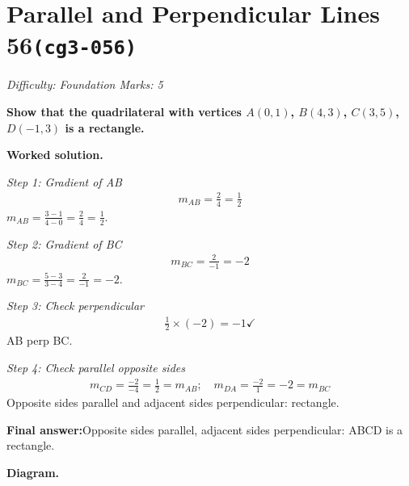 \documentclass[11pt]{article}
\newcommand{\question}[1]{\par\medskip\noindent\textbf{#1}\par}
\begin{document}
\section*{Parallel and Perpendicular Lines 56\quad\small\texttt{(cg3-056)}}
\textit{Difficulty: Foundation \quad\textbar\quad Marks: 5}

\question{Show that the quadrilateral with vertices \( A(0,1) \), \( B(4,3) \), \( C(3,5) \), \( D(-1,3) \) is a rectangle.}

\textbf{Worked solution.}

\textit{Step 1: Gradient of AB}
\[\begin{gathered}
m_{AB} = \frac{2}{4} = \frac{1}{2}
\end{gathered}\]
\( m_{AB} = \tfrac{3 - 1}{4 - 0} = \tfrac{2}{4} = \tfrac{1}{2} \).

\textit{Step 2: Gradient of BC}
\[\begin{gathered}
m_{BC} = \frac{2}{-1} = -2
\end{gathered}\]
\( m_{BC} = \tfrac{5 - 3}{3 - 4} = \tfrac{2}{-1} = -2 \).

\textit{Step 3: Check perpendicular}
\[\begin{gathered}
\frac{1}{2} \times (-2) = -1 \checkmark
\end{gathered}\]
AB perp BC.

\textit{Step 4: Check parallel opposite sides}
\[\begin{gathered}
m_{CD} = \frac{-2}{-4} = \frac{1}{2} = m_{AB}; \quad m_{DA} = \frac{-2}{1} = -2 = m_{BC}
\end{gathered}\]
Opposite sides parallel and adjacent sides perpendicular: rectangle.

\begin{answerbox}
\textbf{Final answer:}\quad Opposite sides parallel, adjacent sides perpendicular: ABCD is a rectangle.
\end{answerbox}
\textbf{Diagram.}
\end{document}

